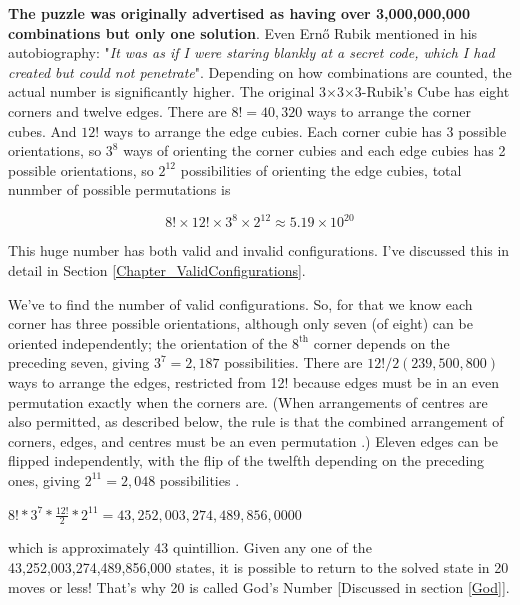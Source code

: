 \documentclass[12pt,a4paper]{article}
\theoremstyle{custom}
\newcommand{\Tthree}{3$\times$3$\times$3-}
\begin{document}
\textbf{The puzzle was originally advertised as having over 3,000,000,000 combinations but only one solution}. Even Ern\H{o} Rubik mentioned in his autobiography: "\textit{It was as if I were staring blankly at a secret code, which I had created but could not penetrate}".
Depending on how combinations are counted, the actual number is significantly higher.
The original \Tthree Rubik's Cube has eight corners and twelve edges. There are $8!= 40,320$ ways to arrange the corner cubes. 
And $12!$ ways to arrange the edge cubies. Each corner cubie has 3 possible orientations, so $3^8$ ways of orienting the corner cubies and each edge cubies has 2 possible orientations, so $2^{12}$ possibilities of orienting the edge cubies, total nunmber of possible permutations  is

$$\boxed{8! \times 12!\times 3^8 \times 2^{12} \approx 5.19 \times 10^{20}}$$

This huge number has both valid and invalid configurations. I've discussed this in detail in Section \ref{Chapter_ValidConfigurations}. 

We've to find the number of valid configurations. 
So, for that we know each corner has three possible orientations, although only seven (of eight) can be oriented independently; the orientation of the $8^\text{th}$ corner depends on the preceding seven, giving $3^{7}= 2,187$ possibilities.
There are $12!/2 (239,500,800)$ ways to arrange the edges, restricted from 12! because edges must be in an even permutation exactly when the corners are. (When arrangements of centres are also permitted, as described below, the rule is that the combined arrangement of corners, edges, and centres must be an even permutation \cite{Hu}.) Eleven edges can be flipped independently, with the flip of the twelfth depending on the preceding ones, giving $2^{11}= 2,048$ possibilities \cite{wong2010group}.\\

\begin{center}
    $\boxed{8! * 3^{7} * \frac{12!}{2} * 2^{11}  = 43,252,003,274,489,856,0000}$
\end{center}
which is approximately $43$ quintillion.
Given any one of
the 43,252,003,274,489,856,000 states, it is possible to return to the solved state in 20
moves or less! That’s why 20 is called God’s Number [Discussed in section \ref{God}].
\end{document}
